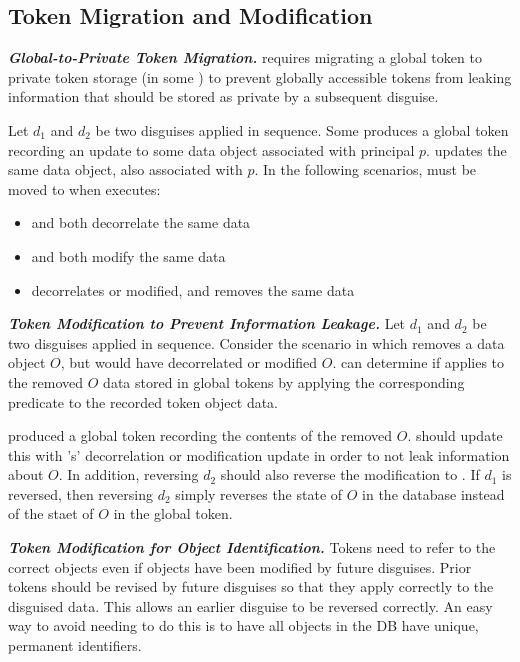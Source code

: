 \subsection{Token Migration and Modification}
\noindent\textbf{\emph{Global-to-Private Token Migration.}}
\sys requires migrating a global token to private token storage (in some ) to prevent
globally accessible tokens from leaking information that should be stored as private by a subsequent
disguise.

Let $d_1$ and $d_2$ be two disguises applied in sequence.
Some  produces a global token  recording an update to some data object
associated with principal $p$.  updates the same data object, also associated with $p$.
In the following scenarios,  must be moved to  when  executes:
\begin{itemize}
\item {} and  both decorrelate the same data
\item {} and  both modify the same data
\item {} decorrelates or modified, and  removes the same data
\end{itemize}

\vspace{6pt}\noindent\textbf{\emph{Token Modification to Prevent Information Leakage.}}
Let $d_1$ and $d_2$ be two disguises applied in sequence.
Consider the scenario in which  removes a data object $O$, but  would have decorrelated
or modified $O$.
\sys can determine if  applies to the removed $O$ data stored in global tokens by applying
the corresponding  predicate to the recorded token object data.

 produced a global token  recording the contents of the removed $O$.
\sys should update this  with 's' decorrelation or modification update in order
to not leak information about $O$.
In addition, reversing $d_2$ should also reverse the modification to . If $d_1$ is
reversed, then reversing $d_2$ simply reverses the state of $O$ in the database instead of the staet
of $O$ in the global token.

\vspace{6pt}\noindent\textbf{\emph{Token Modification for Object Identification.}}
Tokens need to refer to the correct objects even if objects have been modified by future disguises.
Prior tokens should be revised by future disguises so that they apply correctly to the disguised
data.
This allows an earlier disguise to be reversed correctly.
An easy way to avoid needing to do this is to have all objects in the DB have unique, permanent
identifiers.

